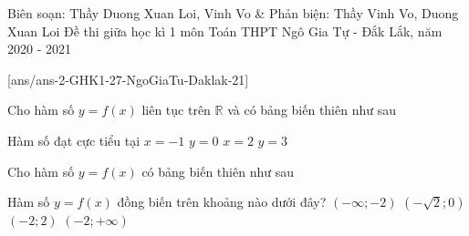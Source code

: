 \begin{name}
	{Biên soạn: Thầy Duong Xuan Loi, Vinh Vo \& Phản biện: Thầy Vinh Vo, Duong Xuan Loi}
	{Đề thi giữa học kì 1 môn Toán THPT Ngô Gia Tự - Đắk Lắk, năm 2020 - 2021}
\end{name}
	\setcounter{ex}{0}\setcounter{bt}{0}
	[ans/ans-2-GHK1-27-NgoGiaTu-Daklak-21]

\begin{ex}%
	Cho hàm số $y=f(x)$ liên tục trên $\mathbb{R}$ và có bảng biến thiên như sau
	\begin{center}
	\end{center}
	Hàm số đạt cực tiểu tại
	\choice
	{$x=-1$}
	{$y=0$}
	{\True $x=2$}
	{$y=3$}
\end{ex}
\begin{ex}%
	Cho hàm số $y=f(x)$ có bảng biến thiên như sau
	\begin{center}
	\end{center}
	Hàm số $y=f(x)$ đồng biến trên khoảng nào dưới đây?
	\choice
	{$(-\infty;-2)$}
	{\True $\left(-\sqrt{2};0\right)$}
	{$(-2;2)$}
	{$(-2;+\infty)$}
\end{ex}
